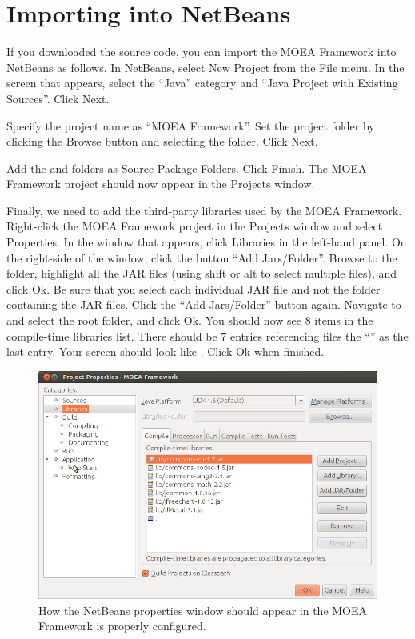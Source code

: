 \section{Importing into NetBeans}
If you downloaded the source code, you can import the MOEA Framework into NetBeans as follows.  In NetBeans, select New Project from the File menu.  In the screen that appears, select the ``Java'' category and ``Java Project with Existing Sources''.  Click Next.

Specify the project name as ``MOEA Framework''.  Set the project folder by clicking the Browse button and selecting the \folder{\moeaframework} folder.  Click Next.

Add the  and  folders as Source Package Folders.  Click Finish.  The MOEA Framework project should now appear in the Projects window.

Finally, we need to add the third-party libraries used by the MOEA Framework.  Right-click the MOEA Framework project in the Projects window and select Properties.  In the window that appears, click Libraries in the left-hand panel.  On the right-side of the window, click the button ``Add Jars/Folder''.  Browse to the  folder, highlight all the JAR files (using shift or alt to select multiple files), and click Ok.  Be sure that you select each individual JAR file and not the folder containing the JAR files.  Click the ``Add Jars/Folder'' button again.  Navigate to and select the root \folder{\moeaframework} folder, and click Ok.  You should now see $8$ items in the compile-time libraries list.  There should be $7$ entries referencing  files the ``'' as the last entry.  Your screen should look like .  Click Ok when finished.

\begin{figure}
  \center
  \includegraphics[width=.8\linewidth]{netbeans.png}
  \caption{How the NetBeans properties window should appear in the MOEA Framework is properly configured.}
  \label{fig:netbeans}
\end{figure}

